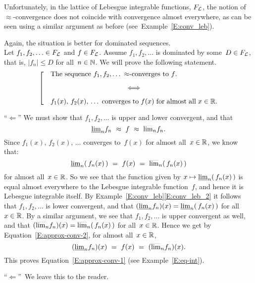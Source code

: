 \documentclass[main.tex]{subfiles}
\begin{document}
\begin{ex}
\label{E:approx-conv}
Unfortunately,
in the lattice of Lebesgue integrable functions, $F_{\mathcal{L}}$,
the notion of $\approx$-convergence
does not coincide with convergence almost everywhere,
as can be seen using a similar argument
as before (see~Example~\ref{E:conv_leb}).

Again, the situation is better for dominated sequences.\\
Let $f_1,f_2,\dotsc \in F_{\mathcal{L}}$ and $f\in F_{\mathcal{L}}$.
Assume $f_1,f_2,\dotsc$ is dominated by some~$D\in F_{\mathcal{L}}$,
that is, $|f_n|\leq D$ for all~$n\in\mathbb{N}$.
We will prove the following statement.
\begin{equation}
\left[\quad
\begin{minipage}{.7\columnwidth}
 The sequence $f_1,f_2,\dotsc$
 $\approx$-converges to~$f$.
\begin{center}
$\Longleftrightarrow$
\end{center}
$f_1(x),\,f_2(x),\,\dotsc$
converges to~$f(x)$ for almost all~$x\in\R$.
\end{minipage}
\right.
\end{equation}
\vspace{.3em}

\noindent
``$\Longleftarrow$''
We must show that 
$f_1,f_2,\dotsc$ is upper and lower convergent,
and that
\begin{equation}
\label{E:approx-conv-1}
\smash{\underline{\lim}_{n}}f_n \ \approx \ f\ \approx\  \smash{\overline{\lim}_{n}}f_n.
\end{equation}
Since $f_1(x),\,f_2(x),\,\dotsc$ 
converges to~$f(x)$ for almost all~$x\in \mathbb{R}$,
we know that:
\begin{equation}
\label{E:approx-conv-2}
\smash{\underline{\lim}_{n}}(\,f_n(x)\,) \ =\ f(x)\ =\ \smash{\overline{\lim}_{n}} (\,f_n (x)\,)
\end{equation}
for almost all~$x\in \mathbb{R}$.
So we see that the function given by $x\mapsto \smash{\underline{\lim}_{n}}(\,f_n(x)\,)$
is equal almost everywhere to the Lebesgue integrable function~$f$,
and hence it is Lebesgue integrable itself.
By Example~\ref{E:conv_leb}\ref{E:conv_leb_2}
it follows that $f_1,f_2,\dotsc$ is lower convergent,
and that $(\smash{\underline{\lim}_{n}}f_n)(x) = \smash{\underline{\lim}_{n}}(\,f_n(x)\,)$
for all~$x\in\mathbb{R}$.
By a similar argument,
we see that $f_1,f_2,\dotsc$ is upper convergent as well,
and that $(\smash{\overline{\lim}_{n}}f_n)(x) = \smash{\overline{\lim}_{n}}(\,f_n(x)\,)$
for all~$x\in \mathbb{R}$.
Hence we get by Equation~\eqref{E:approx-conv-2},
for almost all~$x\in \mathbb{R}$,
\begin{equation*}
(\smash{\underline{\lim}_{n}}f_n)(x) \ =\ f(x)\ =\ (\smash{\overline{\lim}_{n}} f_n) (x).
\end{equation*}
This proves Equation~\eqref{E:approx-conv-1}
(see Example~\ref{E:eq-int}).
\vspace{.3em}

\noindent
``$\Longleftarrow$''\ 
We leave this to the reader.
\end{ex}
\end{document}
